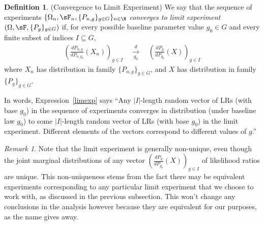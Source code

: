 \documentclass[12pt]{article}
\theoremstyle{plain}
\theoremstyle{definition}
\newtheorem{defn}[thm]{Definition}
\theoremstyle{remark}
\newtheorem*{rmk}{Remark}
\newcommand{\dto}{\xrightarrow{d}}
\begin{document}
\clearpage
\begin{defn}(Convergence to Limit Experiment)
\label{defn:limitexp}
We say that the sequence of experiments
$\{\Omega_n,\sF_n,\{P_{n,g}\}_{g\in G}\}_{n\in\N}$
\emph{converges to limit experiment}
$(\Omega,\sF,\{P_{g}\}_{g\in G})$ if,
for every possible baseline parameter value $g_0\in G$ and
every finite subset of indices $I\subseteq  G$,
\begin{align}
  \left(
  \frac{dP_{n,g}}{dP_{n,g_0}}(X_n)
  \right)_{g\in I}
  \quad\underset{g_0}{\dto}\quad
  \left(
  \frac{dP_{g}}{dP_{g_0}}(X)
  \right)_{g\in I}
  \label{limexp}
\end{align}
where $X_n$  has distribution in family $\{P_{n,g}\}_{g\in G}$,
and $X$ has distribution in family $\{P_g\}_{g\in G}$.

In words, Expression~\ref{limexp} says ``Any $|I|$-length random vector
of LRs (with base $g_0$) in the sequence of experiments converges in
distribution (under baseline law $g_0$) to some $|I|$-length random
vector of LRs (with base $g_0$) in the limit experiment. Different
elements of the vectors correspond to different values of $g$.''
\end{defn}
\begin{rmk}
Note that the limit experiment is generally non-unique, even though the
joint marginal distributions of any vector
$\left(\frac{dP_g}{dP_{g_0}}(X)\right)_{g\in I}$ of likelihood ratios
are unique.
This non-uniqueness stems from the fact there may be equivalent
experiments corresponding to any particular limit experiment that we
choose to work with, as discussed in the previous subsection.
This won't change any conclusions in the analysis however because they
are equivalent for our purposes, as the name gives away.
\end{rmk}
\end{document}
